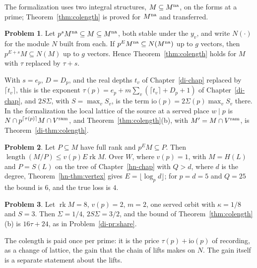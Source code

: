 \documentclass[reqno]{amsart}
\newcounter{chap}
\theoremstyle{definition}
\newtheorem{problem}{Problem}[section]
\theoremstyle{plain}
\theoremstyle{remark}
\newcommand{\rk}{\operatorname{rk}}
\newcommand{\len}{\operatorname{length}}
\begin{document}
The formalization uses two integral structures, \(M\subseteq M^{\rm na}\), on the forms at a prime; Theorem~\ref{thm:colength} is proved for \(M^{\rm na}\) and transferred.

\begin{problem}\label{pr:two-structures}
Let \(p^{s}M^{\rm na}\subseteq M\subseteq M^{\rm na}\), both stable under the \(y_v\), and write \(N(\cdot)\) for the module \(N\) built from each.  If \(p^EM^{\rm na}\subseteq N(M^{\rm na})\) up to \(g\) vectors, then \(p^{E+s}M\subseteq N(M)\) up to \(g\) vectors.  Hence Theorem~\ref{thm:colength} holds for \(M\) with \(\tau\) replaced by \(\tau+s\).
\end{problem}

With \(s=e_p\), \(D=D_p\), and the real depths \(t_v\) of Chapter~\ref{di-chap} replaced by \(\lceil t_v\rceil\), this is the exponent \(\tau(p)=e_p+m\sum_v(\lceil t_v\rceil+D_p+1)\) of Chapter~\ref{di-chap}, and \(2S\Sigma\), with \(S=\max_vS_v\), is the term \(\mathrm{io}(p)=2\Sigma(p)\max_vS_v\) there.  In the formalization the local lattice of the source at a served place \(w\mid p\) is \(N\cap p^{\lceil\tau(p)\rceil}M\cap V^{\rm ram}\), and Theorem~\ref{thm:colength}(b), with \(M'=M\cap V^{\rm ram}\), is Theorem~\ref{di-thm:colength}.

\begin{problem}\label{pr:tree}
Let \(P\subseteq M\) have full rank and \(p^EM\subseteq P\).  Then \(\len(M/P)\le v(p)E\rk M\).  Over \(W\), where \(v(p)=1\), with \(M=H(L)\) and \(P=S(L)\) on the tree of Chapter~\ref{hn-chap} with \(Q>d\), where \(d\) is the degree, Theorem~\ref{hn-thm:vertex} gives \(E=\lfloor\log_pd\rfloor\); for \(p=d=5\) and \(Q=25\) the bound is \(6\), and the true loss is \(4\).
\end{problem}

\begin{problem}\label{pr:share-check}
Let \(\rk M=8\), \(v(p)=2\), \(m=2\), one served orbit with \(\kappa=1/8\) and \(S=3\).  Then \(\Sigma=1/4\), \(2S\Sigma=3/2\), and the bound of Theorem~\ref{thm:colength}(b) is \(16\tau+24\), as in Problem~\ref{di-pr:share}.
\end{problem}

The colength is paid once per prime: it is the price \(\tau(p)+\mathrm{io}(p)\) of recording, as a change of lattice, the gain that the chain of lifts makes on \(N\).  The gain itself is a separate statement about the lifts.
\end{document}
